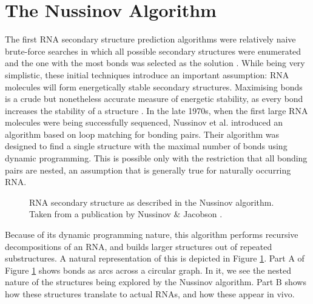 \documentclass[12pt, a4paper]{article}
\begin{document}
\section*{The Nussinov Algorithm} The first RNA secondary structure prediction algorithms were relatively naive brute-force searches in which all possible secondary structures were enumerated and the one with
the most bonds was selected as the solution \cite{nussinov1978algorithms}. While being very simplistic,
these initial techniques introduce an important assumption: RNA molecules will
form energetically stable secondary structures. Maximising bonds is a crude but
nonetheless accurate measure of energetic stability, as every bond increases the
stability of a structure \cite{nussinov1978algorithms}. In the late 1970s, when the first large RNA molecules
were being successfully sequenced, Nussinov et al. \cite{nussinov1978algorithms} introduced an algorithm
based on loop matching for bonding pairs. Their algorithm was designed to find a
single structure with the maximal number of bonds using dynamic programming. This is possible only with the restriction that all bonding pairs are nested, an assumption that is generally true for naturally occurring RNA.

\begin{figure}
\begin{center}
\end{center}
\caption{RNA secondary structure as described in the Nussinov algorithm.
Taken from a publication by Nussinov \& Jacobson \cite{nussinov1980fast}.}
\label{figure1}
\end{figure}


Because of its dynamic programming nature, this algorithm performs recursive decompositions of an RNA, and builds
larger structures out of repeated substructures. A natural representation of this is
depicted in Figure \ref{figure1}. Part A of Figure \ref{figure1} shows bonds as arcs across a circular
graph. In it, we see the nested nature of the structures being explored by the
Nussinov algorithm. Part B shows how these structures translate to actual RNAs,
and how these appear in vivo.
\end{document}
